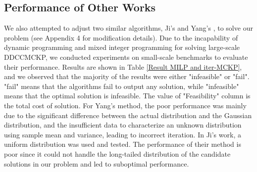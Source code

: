 \documentclass[lettersize,journal]{IEEEtran}
\begin{document}
\subsection{Performance of Other Works}
\label{subsection:jy}
We also attempted to adjust two similar algorithms, Ji's \cite{ji2021data} and Yang's \cite{yang2018algorithm}, to solve our problem (see Appendix 4 for modification details). Due to the incapability of dynamic programming and mixed integer programming for solving large-scale DDCCMCKP, we conducted experiments on small-scale benchmarks to evaluate their performance. 
Results are shown in Table \ref{Result MILP and iter-MCKP}, and we observed that the majority of the results were either "infeasible" or "fail". 
"fail" means that the algorithms fail to output any solution, while "infeasible" means that the optimal solution is infeasible. 
The value of "Feasibility" column is the total cost of solution. 
For Yang's method,  the poor performance was mainly due to the significant difference between the actual distribution and the Gaussian distribution, and the insufficient data to characterize an unknown distribution using sample mean and variance, leading to incorrect iteration.
In Ji's work, a uniform distribution was used and tested. The performance of their method is poor since it could not handle the long-tailed distribution of the candidate solutions in our problem and led to suboptimal performance.

\begin{table}[!t]
\centering
\caption{Result of Ji's \cite{ji2021data} and Yang's \cite{yang2018algorithm}}
\end{table}
\end{document}

